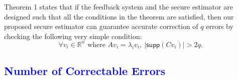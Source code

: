 \documentclass[12pt, conference, a4paper, twoside]{IEEEconf_mod}
\newtheorem{prop}{\bf{Proposition}}
\begin{document}

\noindent
Theorem 1 %
states that if the feedback system and the secure estimator are designed such that all the conditions in the theorem are satisfied, then our proposed secure estimator can guarantee accurate correction of $q$ errors by checking the following very simple condition:
\begin{equation}
\forall v_i \in \mathbb{R}^n \text{ where } Av_i =\lambda_i v_i, ~ \lvert \textsf{supp}(Cv_i) \rvert > 2q.  \nonumber
\end{equation}


\vspace{1mm}
\subsection{\textcolor{blue}{Number of Correctable Errors}}\label{sec:max_q}
\end{document}
